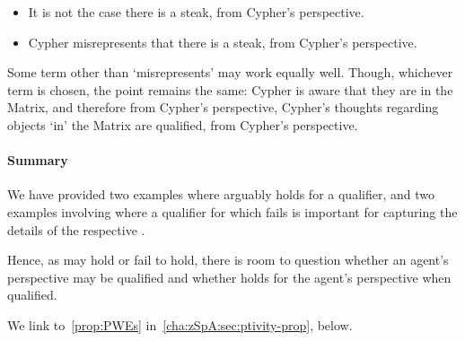 \begin{note}
  \begin{itemize}[noitemsep]
  \item
    It is not the case there is a steak, from Cypher's perspective.
  \item
    Cypher misrepresents that there is a steak, from Cypher's perspective.
  \end{itemize}
  Some term other than `misrepresents' may work equally well.
  Though, whichever term is chosen, the point remains the same:
  Cypher is aware that they are in the Matrix, and therefore from Cypher's perspective, Cypher's thoughts regarding objects `in' the Matrix are qualified, from Cypher's perspective.
\end{note}

\paragraph{Summary}

\begin{note}
  We have provided two examples where \ptivity{} arguably holds for a qualifier, and two examples involving  where a qualifier for which \ptivity{} fails is important for capturing the details of the respective .

  Hence, as \ptivity{} may hold or fail to hold, there is room to question whether an agent's perspective may be qualified and whether \ptivity{} holds for the agent's perspective when qualified.

  We link \ptivity{} to~\autoref{prop:PWEs} in~\autoref{cha:zSpA:sec:ptivity-prop}, below.
\end{note}

